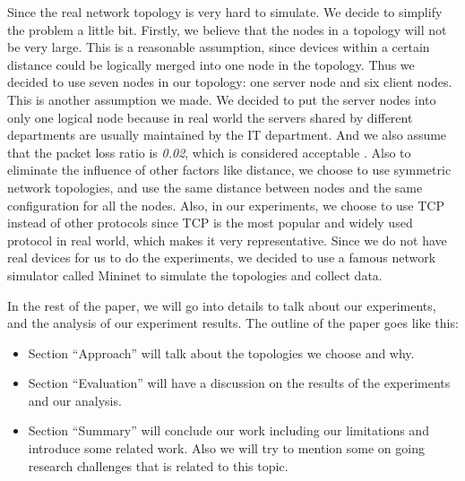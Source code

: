 Since the real network topology is very hard to simulate. 
We decide to simplify the problem a little bit. 
Firstly, we believe that the nodes in a topology will not be very large. 
This is a reasonable assumption, since devices within a certain distance 
could be logically merged into one node in the topology. 
Thus we decided to use seven nodes in our topology: 
one server node and six client nodes. This is another assumption we made. 
We decided to put the server nodes into only one logical node 
because in real world the servers shared by different departments are usually 
maintained by the IT department. And we also assume that 
the packet loss ratio is \textit{0.02}, which is considered acceptable \cite{PacketLoss:wiki}. 
Also to eliminate the influence of other factors like distance, 
we choose to use symmetric network topologies, 
and use the same distance between nodes and the same configuration for all the nodes.
Also, in our experiments, we choose to use TCP instead of other protocols since TCP is the most 
popular and widely used protocol in real world, which makes it very representative. Since we do not 
have real devices for us to do the experiments, we decided to use a famous network simulator called
Mininet\cite{Mininet:official} to simulate the topologies and collect data.

In the rest of the paper, we will go into details to talk about our experiments, and the analysis 
of our experiment results. The outline of the paper goes like this:
\begin{itemize}
    \item Section ``Approach'' will talk about the topologies we choose and why.
    \item Section ``Evaluation'' will have a discussion on the results of the experiments and our analysis.
    \item Section ``Summary'' will conclude our work including our limitations and introduce some related work. 
    Also we will try to mention some on going research challenges that is related to this topic.
\end{itemize}

